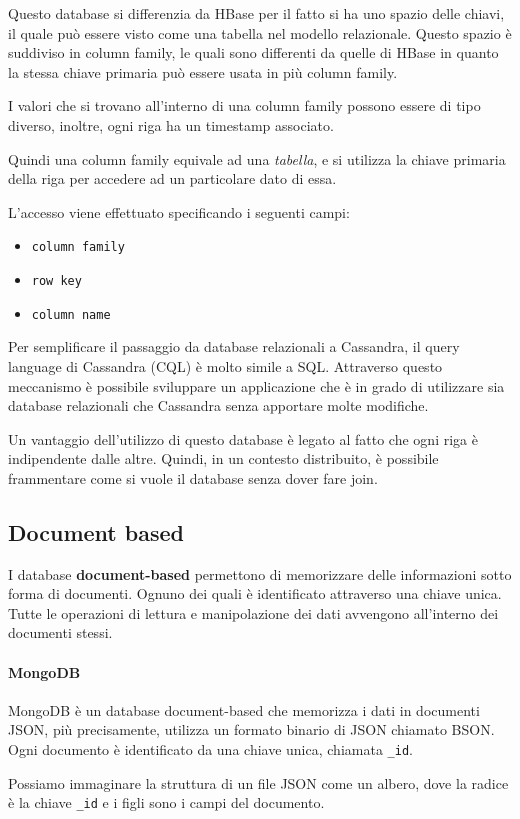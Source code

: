Questo database si differenzia da HBase per il fatto si ha uno spazio delle chiavi,
il quale può essere visto come una tabella nel modello relazionale. Questo spazio
è suddiviso in column family, le quali sono differenti da quelle di HBase in quanto
la stessa chiave primaria può essere usata in più column family.

I valori che si trovano all'interno di una column family possono essere di tipo
diverso, inoltre, ogni riga ha un timestamp associato.

Quindi una column family equivale ad una \textit{tabella}, e si utilizza la chiave
primaria della riga per accedere ad un particolare dato di essa.

L'accesso viene effettuato specificando i seguenti campi:
\begin{itemize}
      \item \texttt{column family}
      \item \texttt{row key}
      \item \texttt{column name}
\end{itemize}
Per semplificare il passaggio da database relazionali a Cassandra, il query
language di Cassandra (CQL) è molto simile a SQL. Attraverso questo meccanismo
è possibile sviluppare un applicazione che è in grado di utilizzare sia database
relazionali che Cassandra senza apportare molte modifiche.

Un vantaggio dell'utilizzo di questo database è legato al fatto che ogni riga è
indipendente dalle altre. Quindi, in un contesto distribuito, è possibile frammentare
come si vuole il database senza dover fare join.
\subsection{Document based}
I database \textbf{document-based} permettono di memorizzare delle informazioni sotto
forma di documenti. Ognuno dei quali è identificato attraverso una chiave unica.
Tutte le operazioni di lettura e manipolazione dei dati avvengono all'interno
dei documenti stessi.
\paragraph{MongoDB}
MongoDB è un database document-based che memorizza i dati in documenti JSON, più
precisamente, utilizza un formato binario di JSON chiamato BSON. Ogni documento
è identificato da una chiave unica, chiamata \texttt{\_id}.

Possiamo immaginare la struttura di un file JSON come un albero, dove la radice
è la chiave \texttt{\_id} e i figli sono i campi del documento.


